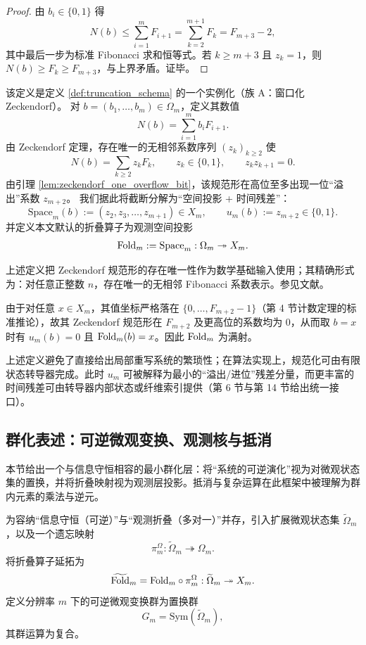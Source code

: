 \begin{proof}
\MathTag
由 $b_i\in\{0,1\}$ 得
$$
N(b)\le \sum_{i=1}^{m} F_{i+1}=\sum_{k=2}^{m+1}F_k=F_{m+3}-2,
$$
其中最后一步为标准 Fibonacci 求和恒等式。若 $k\ge m+3$ 且 $z_k=1$，则 $N(b)\ge F_k\ge F_{m+3}$，与上界矛盾。证毕。
\end{proof}

\begin{definition}[窗口折叠与最小时间残差]\label{def:Fold}
\MathTag
\AuditTag 该定义是定义 \ref{def:truncation_schema} 的一个实例化（族 A：窗口化 Zeckendorf）。
对 $b=(b_1,\dots,b_m)\in \Omega_m$，定义其数值
$$
N(b)=\sum_{i=1}^{m} b_i F_{i+1}.
$$
由 Zeckendorf 定理，存在唯一的无相邻系数序列 $(z_k)_{k\ge 2}$ 使
$$
N(b)=\sum_{k\ge 2} z_k F_k,\qquad z_k\in\{0,1\},\qquad z_k z_{k+1}=0.
$$
由引理 \ref{lem:zeckendorf_one_overflow_bit}，该规范形在高位至多出现一位“溢出”系数 $z_{m+2}$。
我们据此将截断分解为“空间投影 + 时间残差”：
$$
\mathrm{Space}_m(b):=(z_2,z_3,\dots,z_{m+1})\in X_m,
\qquad
u_m(b):=z_{m+2}\in\{0,1\}.
$$
\MathTag 并定义本文默认的折叠算子为观测空间投影
$$
\mathrm{Fold}_m:=\mathrm{Space}_m:\Omega_m\twoheadrightarrow X_m.
$$
\end{definition}
\AuditTag 上述定义把 Zeckendorf 规范形的存在唯一性作为数学基础输入使用；其精确形式为：对任意正整数 $n$，存在唯一的无相邻 Fibonacci 系数表示。参见文献。\cite{kkmw_zeckendorf_summands}

由于对任意 $x\in X_m$，其值坐标严格落在 $\{0,\dots,F_{m+2}-1\}$（第 4 节计数定理的标准推论），故其 Zeckendorf 规范形在 $F_{m+2}$ 及更高位的系数均为 $0$，从而取 $b=x$ 时有 $u_m(b)=0$ 且 $\mathrm{Fold}_m(b)=x$。因此 $\mathrm{Fold}_m$ 为满射。

\begin{remark}
上述定义避免了直接给出局部重写系统的繁琐性；在算法实现上，规范化可由有限状态转导器完成。此时 $u_m$ 可被解释为最小的“溢出/进位”残差分量，而更丰富的时间残差可由转导器内部状态或纤维索引提供（第 6 节与第 14 节给出统一接口）。\cite{shallit_robbins_ardila_berstel}
\end{remark}

\subsection{群化表述：可逆微观变换、观测核与抵消}

本节给出一个与信息守恒相容的最小群化层：将“系统的可逆演化”视为对微观状态集的置换，并将折叠映射视为观测层投影。抵消与复杂运算在此框架中被理解为群内元素的乘法与逆元。

\begin{definition}[扩展微观状态与可逆变换群]\label{def:extended-micro-group}
为容纳“信息守恒（可逆）”与“观测折叠（多对一）”并存，引入扩展微观状态集 $\widetilde{\Omega}_m$，以及一个遗忘映射
$$
\pi_m^{\Omega}:\widetilde{\Omega}_m\twoheadrightarrow \Omega_m.
$$
将折叠算子延拓为
$$
\widetilde{\mathrm{Fold}}_m=\mathrm{Fold}_m\circ \pi_m^{\Omega}:\widetilde{\Omega}_m\twoheadrightarrow X_m.
$$
定义分辨率 $m$ 下的可逆微观变换群为置换群
$$
G_m=\mathrm{Sym}(\widetilde{\Omega}_m),
$$
其群运算为复合。
\end{definition}

